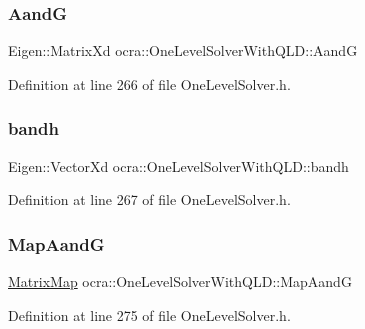 \subsubsection{\texorpdfstring{AandG}{AandG}}
{\footnotesize\ttfamily Eigen\+::\+Matrix\+Xd ocra\+::\+One\+Level\+Solver\+With\+Q\+L\+D\+::\+AandG\hspace{0.3cm}{\ttfamily [protected]}}



Definition at line 266 of file One\+Level\+Solver.\+h.

\hypertarget{classocra_1_1OneLevelSolverWithQLD_a5f85407cde010aa3c41dbc80f3dd254e}{}\label{classocra_1_1OneLevelSolverWithQLD_a5f85407cde010aa3c41dbc80f3dd254e} 
\subsubsection{\texorpdfstring{bandh}{bandh}}
{\footnotesize\ttfamily Eigen\+::\+Vector\+Xd ocra\+::\+One\+Level\+Solver\+With\+Q\+L\+D\+::bandh\hspace{0.3cm}{\ttfamily [protected]}}



Definition at line 267 of file One\+Level\+Solver.\+h.

\hypertarget{classocra_1_1OneLevelSolverWithQLD_a67c9e0cc8efc507c4e5f0cf216cf5073}{}\label{classocra_1_1OneLevelSolverWithQLD_a67c9e0cc8efc507c4e5f0cf216cf5073} 
\subsubsection{\texorpdfstring{Map\+AandG}{MapAandG}}
{\footnotesize\ttfamily \hyperlink{group__solver_ga2890a4739c18700eeea0645d1e41b5f7}{Matrix\+Map} ocra\+::\+One\+Level\+Solver\+With\+Q\+L\+D\+::\+Map\+AandG\hspace{0.3cm}{\ttfamily [protected]}}



Definition at line 275 of file One\+Level\+Solver.\+h.

\hypertarget{classocra_1_1OneLevelSolverWithQLD_aedba3797f1f7d4e36a4d5ecf147472a0}{}\label{classocra_1_1OneLevelSolverWithQLD_aedba3797f1f7d4e36a4d5ecf147472a0} 
